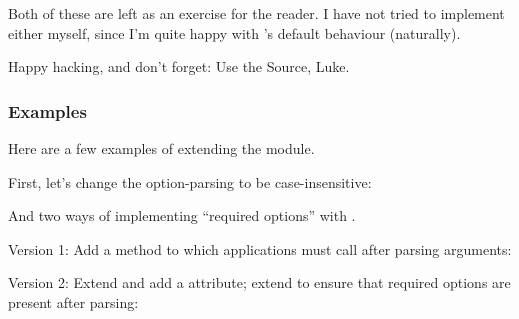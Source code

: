 Both of these are left as an exercise for the reader.  I have not
tried to implement either myself, since I'm quite happy with
's default behaviour (naturally).

Happy hacking, and don't forget: Use the Source, Luke.

\subsubsection{Examples\label{optparse-extending-examples}}

Here are a few examples of extending the  module.

First, let's change the option-parsing to be case-insensitive:



And two ways of implementing ``required options'' with
.

Version 1: Add a method to  which applications
must call after parsing arguments:



Version 2: Extend  and add a 
attribute; extend  to ensure that required options
are present after parsing:


